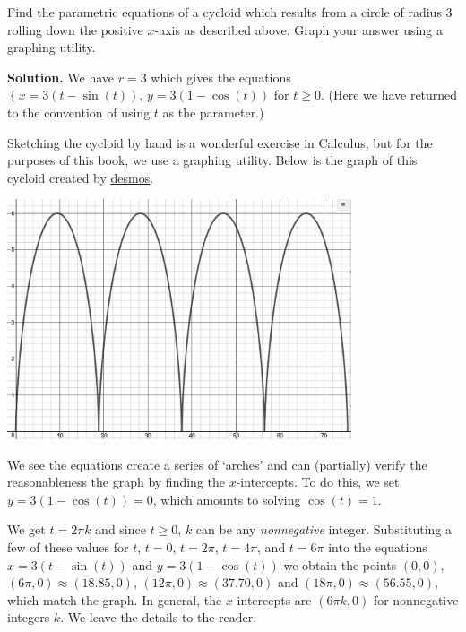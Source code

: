 \begin{ex} \label{cycloidex}  Find the parametric equations of a cycloid which results from a circle of radius $3$ rolling down the positive $x$-axis as described above.  Graph your answer using a graphing utility.

\smallskip

{\bf Solution.}  We have $r = 3$ which gives the equations $\left\{ x = 3(t -\sin(t)), \, y = 3(1-\cos(t)) \right.$ for $t \geq 0$.  (Here we have returned to the convention of using $t$ as the parameter.)   

\smallskip

Sketching the cycloid by hand is a wonderful exercise in Calculus, but for the purposes of this book, we use a graphing utility.  Below is the graph of this cycloid created by \href{https://www.desmos.com/calculator}{\underline{desmos}}.


\begin{center}

\includegraphics[width=4in]{./ParametricEquationsGraphics/cycloid.jpg}

\end{center}

We see the equations create a series of `arches' and can (partially) verify the reasonableness the graph by finding the $x$-intercepts.  To do this, we set $y = 3(1-\cos(t)) = 0$, which amounts to solving $\cos(t) = 1$.  

\smallskip

We get $t = 2 \pi k$ and since $t \geq 0$, $k$ can be any \textit{nonnegative} integer.  Substituting a few of these values for $t$, $t = 0$, $t = 2\pi$, $t = 4\pi$, and $t=6\pi$ into the equations $x = 3(t -\sin(t))$ and $y = 3(1-\cos(t))$ we obtain the points $(0,0)$, $(6\pi, 0) \approx (18.85, 0)$,  $(12 \pi,0) \approx (37.70, 0)$ and $(18\pi, 0) \approx ( 56.55 , 0)$, which match the graph. In general, the $x$-intercepts are $(6\pi k, 0)$ for nonnegative integers $k$.  We leave the details to the reader.


\end{ex}
